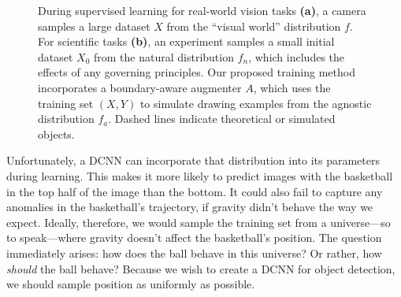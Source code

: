 \documentclass[10pt, journal]{IEEEtran}
\begin{document}

\begin{figure}
  \centering
  \hfill
  \caption{During supervised learning for real-world vision tasks \textbf{(a)},
    a camera samples a large dataset $X$ from the ``visual world'' distribution
    $f$. For scientific tasks \textbf{(b)}, an experiment samples a small
    initial dataset $X_0$ from the natural distribution $f_n$, which includes
    the effects of any governing principles. Our proposed training method
    incorporates a boundary-aware augmenter $A$, which uses the training set
    $(X,Y)$ to simulate drawing examples from the agnostic distribution
    $f_a$. Dashed lines indicate theoretical or simulated objects.}
  \label{fig:dependency-graphs}
\end{figure}

Unfortunately, a DCNN can incorporate that distribution into its parameters
during learning. This makes it more likely to predict images with the basketball
in the top half of the image than the bottom. It could also fail to capture any
anomalies in the basketball's trajectory, if gravity didn't behave the way we
expect. Ideally, therefore, we would sample the training set from a
universe---so to speak---where gravity doesn't affect the basketball's
position. The question immediately arises: how does the ball behave in this
universe? Or rather, how \emph{should} the ball behave? Because we wish to
create a DCNN for object detection, we should sample position as uniformly as
possible.
\end{document}
